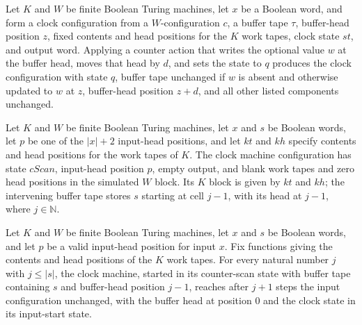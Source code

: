 \begin{lemma}
\label{Complexity.TimeHierarchy.ctrAction_apply}
\leanok
{}
Let $K$ and $W$ be finite Boolean Turing machines, let $x$ be a Boolean word, and form a
clock configuration from a $W$-configuration $c$, a buffer tape $\tau$, buffer-head
position $z$, fixed contents and head positions for the $K$ work tapes, clock state
$st$, and output word. Applying a counter action that writes the optional value $w$ at
the buffer head, moves that head by $d$, and sets the state to $q$ produces the clock
configuration with state $q$, buffer tape unchanged if $w$ is absent and otherwise
updated to $w$ at $z$, buffer-head position $z+d$, and all other listed components
unchanged.
\end{lemma}

\begin{definition}
\label{Complexity.TimeHierarchy.cScanCfg}
\leanok
{}
Let $K$ and $W$ be finite Boolean Turing machines, let $x$ and $s$ be Boolean words, let
$p$ be one of the $|x|+2$ input-head positions, and let $kt$ and $kh$ specify contents
and head positions for the work tapes of $K$. The clock machine configuration has state
$cScan$, input-head position $p$, empty output, and blank work tapes and zero head
positions in the simulated $W$ block. Its $K$ block is given by $kt$ and $kh$; the
intervening buffer tape stores $s$ starting at cell $j-1$, with its head at $j-1$, where
$j\in\mathbb N$.
\end{definition}

\begin{lemma}
\label{Complexity.TimeHierarchy.cScanCfg_run}
\leanok
{}
Let $K$ and $W$ be finite Boolean Turing machines, let $x$ and $s$ be Boolean words, and
let $p$ be a valid input-head position for input $x$. Fix functions giving the contents
and head positions of the $K$ work tapes. For every natural number $j$ with $j\le |s|$,
the clock machine, started in its counter-scan state with buffer tape containing $s$ and
buffer-head position $j-1$, reaches after $j+1$ steps the input configuration unchanged,
with the buffer head at position $0$ and the clock state in its input-start state.
\end{lemma}

